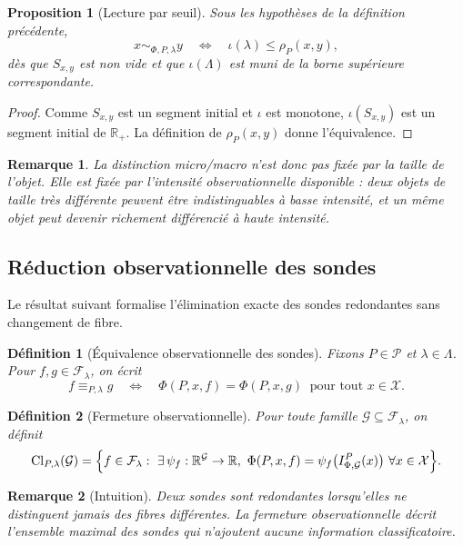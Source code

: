 \documentclass[11pt,a4paper]{article}
\newtheorem{definition}{Définition}
\newtheorem{proposition}{Proposition}
\newtheorem{remark}{Remarque}
\begin{document}
\begin{proposition}[Lecture par seuil]
Sous les hypothèses de la définition précédente,
\[
x\sim_{\Phi,P,\lambda}y
\quad\Longleftrightarrow\quad
\iota(\lambda)\le \rho_P(x,y),
\]
dès que \(S_{x,y}\) est non vide et que \(\iota(\Lambda)\) est muni de la borne supérieure correspondante.
\end{proposition}

\begin{proof}
Comme \(S_{x,y}\) est un segment initial et \(\iota\) est monotone, \(\iota(S_{x,y})\) est un segment initial de \(\mathbb R_+\). La définition de \(\rho_P(x,y)\) donne l'équivalence.
\end{proof}

\begin{remark}
La distinction micro/macro n'est donc pas fixée par la taille de l'objet. Elle est fixée par l'intensité observationnelle disponible : deux objets de taille très différente peuvent être indistinguables à basse intensité, et un même objet peut devenir richement différencié à haute intensité.
\end{remark}

\subsection{Réduction observationnelle des sondes}

Le résultat suivant formalise l'élimination exacte des sondes redondantes sans changement de fibre.

\begin{definition}[Équivalence observationnelle des sondes]
Fixons \(P\in\mathcal P\) et \(\lambda\in\Lambda\). Pour \(f,g\in\mathcal F_\lambda\), on écrit
\[
f\equiv_{P,\lambda} g
\quad\Longleftrightarrow\quad
\Phi(P,x,f)=\Phi(P,x,g)\ \text{ pour tout }x\in\mathcal X.
\]
\end{definition}

\begin{definition}[Fermeture observationnelle]
Pour toute famille \(\mathcal G\subseteq\mathcal F_\lambda\), on définit
\[
\operatorname{Cl}_{P,\lambda}(\mathcal G)
=
\Bigl\{
f\in\mathcal F_\lambda:\ \exists\,\psi_f:\mathbb R^{\mathcal G}\to\mathbb R,\ 
\Phi(P,x,f)=\psi_f\bigl(I_{\Phi,\mathcal G}^P(x)\bigr)\ \forall x\in\mathcal X
\Bigr\}.
\]
\end{definition}

\begin{remark}[Intuition]
Deux sondes sont redondantes lorsqu'elles ne distinguent jamais des fibres différentes. La fermeture observationnelle décrit l'ensemble maximal des sondes qui n'ajoutent aucune information classificatoire.
\end{remark}
\end{document}
